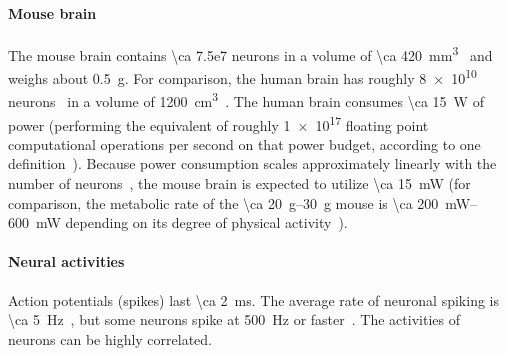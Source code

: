 \paragraph{Mouse brain}
The mouse brain contains \num{\ca 7.5e7} neurons in a volume of \SI{\ca 420}{\milli\meter\cubed}~\cite{vincent10} and weighs about \SI{0.5}{\gram}.
For comparison, the human brain has roughly \num{8e10} neurons~\cite{azevedo09} in a volume of \SI{1200}{\centi\meter\cubed}~\cite{allen02}.
The human brain consumes \SI{\ca 15}{\watt} of power (performing the equivalent of roughly \num{1e17} floating point computational operations per second on that power budget, according to one definition~\cite{sarpeshkar10}).
Because power consumption scales approximately linearly with the number of neurons~\cite{houzel11}, the mouse brain is expected to utilize \SI{\ca 15}{\milli\watt} (for comparison, the metabolic rate of the \SIrange{\ca 20}{30}{\gram} mouse is \SIrange{\ca 200}{600}{\milli\watt} depending on its degree of physical activity~\cite{speakman13}).

\paragraph{Neural activities}
Action potentials (spikes) last \SI{\ca 2}{\milli\second}.
The average rate of neuronal spiking is \SI{\ca 5}{\hertz}~\cite{sarpeshkar10}, but some neurons spike at \SI{500}{\hertz} or faster~\cite{gittis10}.
The activities of neurons can be highly correlated.

